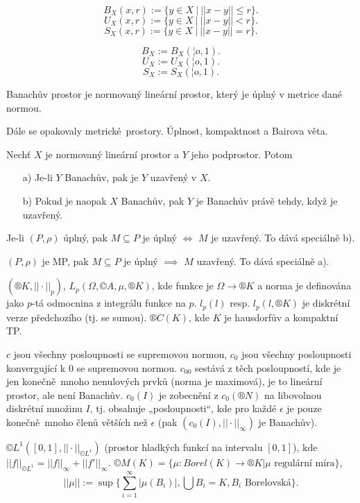 \documentclass[12pt]{article}					%
\begin{document}
\begin{definice}
	$$ B_X\left(x, r\right) := \{ y \in X\ |\ ||x - y|| ≤ r \}.  $$ 
	$$ U_X\left(x, r\right) := \{ y \in X\ |\ ||x - y|| < r \}.  $$ 
	$$ S_X\left(x, r\right) := \{ y \in X\ |\ ||x - y|| = r \}.  $$ 

	$$ B_X := B_X\left(¦o, 1\right). $$ 
	$$ U_X := U_X\left(¦o, 1\right). $$ 
	$$ S_X := S_X\left(¦o, 1\right). $$ 
\end{definice}

\begin{definice}
	Banachův prostor je normovaný lineární prostor, který je úplný v metrice dané normou.
\end{definice}

Dále se opakovaly metrické prostory. Úplnost, kompaktnost a Bairova věta.

\begin{tvrzeni}
	Nechť $X$ je normovaný lineární prostor a $Y$ jeho podprostor. Potom 

	\begin{itemize}
		\item[a)] Je-li $Y$ Banachův, pak je $Y$ uzavřený v $X$.
		\item[b)] Pokud je naopak $X$ Banachův, pak $Y$ je Banachův právě tehdy, když je uzavřený.
	\end{itemize}

	\begin{dukazin}
		Je-li $\left(P,\rho\right)$ úplný, pak $M \subseteq P$ je úplný $\Leftrightarrow$ $M$ je uzavřený. To dává speciálně b).

		$\left(P, \rho\right)$ je MP, pak $M \subseteq P$ je úplný $\implies$ $M$ uzavřený. To dává speciálně a).
	\end{dukazin}
\end{tvrzeni}

\begin{priklady}
	$\left(®K, ||·||_p\right)$, $L_p(\Omega, ©A, \mu, ®K)$, kde funkce je $\Omega \rightarrow ®K$ a norma je definována jako $p$-tá odmocnina z integrálu funkce na $p$. $l_p(l)$ resp. $l_p(l, ®K)$ je diskrétní verze předchozího (tj. se sumou). $®C(K)$, kde $K$ je hausdorfův a kompaktní TP.

	$c$ jsou všechny posloupnosti se supremovou normou, $c_0$ jsou všechny posloupnosti konvergující k 0 se supremovou normou. $c_{00}$ sestává z těch posloupností, kde je jen konečně mnoho nenulových prvků (norma je maximová), je to lineární prostor, ale není Banachův. $c_0(I)$ je zobecnění z $c_0(®N)$ na libovolnou diskrétní množinu $I$, tj. obsahuje „posloupnosti“, kde pro každé $\epsilon$ je pouze konečně mnoho členů větších než $\epsilon$ (pak $(c_0(I), ||·||_∞)$ je Banachův).

	$©L^1([0, 1], || · ||_{©L^1})$ (prostor hladkých funkcí na intervalu $[0, 1]$), kde $||f||_{©L^1} = ||f||_∞ + ||f'||_∞$. $©M(K) = \{\mu : Borel(K) \rightarrow ®K | \mu \text{ regulární míra}\}$,
	$$ ||\mu|| := \sup\{\sum_{i=1}^∞|\mu(B_i)|, \bigcup B_i = K, B_i \text{ Borelovská}\}. $$
\end{priklady}
\end{document}
